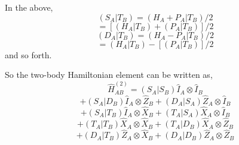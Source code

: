 In the above,
\begin{equation}
(S_A | T_B) = (H_A + P_A | T_B) / 2 
\end{equation}
\[
= [(H_A | T_B) + (P_A | T_B)] / 2
\]
\begin{equation}
(D_A | T_B) = (H_A - P_A | T_B) / 2 
\end{equation}
\[
= (H_A | T_B) - [(P_A | T_B)] / 2
\]
and so forth.

So the two-body Hamiltonian element can be written as,
\begin{equation}
\hat H_{AB}^{(2)} = 
   (S_A | S_B) \hat I_A \otimes \hat I_B
\end{equation}
\[
+  (S_A | D_B) \hat I_A \otimes \hat Z_B
+  (D_A | S_A) \hat Z_A \otimes \hat I_B
\]
\[
+  (S_A | T_B) \hat I_A \otimes \hat X_B
+  (T_A | S_A) \hat X_A \otimes \hat I_B
\]
\[
+  (T_A | T_B) \hat X_A \otimes \hat X_B
+  (T_A | D_B) \hat X_A \otimes \hat Z_B
\]
\[
+  (D_A | T_B) \hat Z_A \otimes \hat X_B
+  (D_A | D_B) \hat Z_A \otimes \hat Z_B
\]


